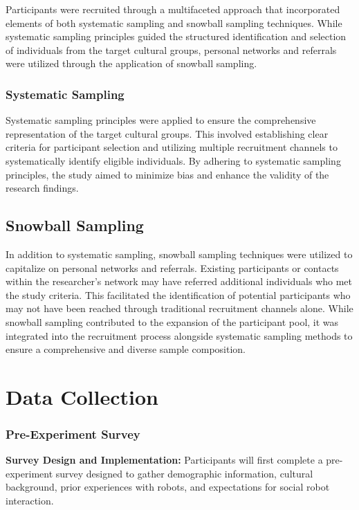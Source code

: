 Participants were recruited through a multifaceted approach that incorporated elements of both systematic sampling and snowball sampling techniques. While systematic sampling principles guided the structured identification and selection of individuals from the target cultural groups, personal networks and referrals were utilized through the application of snowball sampling.

\subsubsection{Systematic Sampling}

Systematic sampling principles were applied to ensure the comprehensive representation of the target cultural groups. This involved establishing clear criteria for participant selection and utilizing multiple recruitment channels to systematically identify eligible individuals. By adhering to systematic sampling principles, the study aimed to minimize bias and enhance the validity of the research findings.

\subsection{Snowball Sampling}

In addition to systematic sampling, snowball sampling techniques were utilized to capitalize on personal networks and referrals. Existing participants or contacts within the researcher's network may have referred additional individuals who met the study criteria. This facilitated the identification of potential participants who may not have been reached through traditional recruitment channels alone. While snowball sampling contributed to the expansion of the participant pool, it was integrated into the recruitment process alongside systematic sampling methods to ensure a comprehensive and diverse sample composition.

\section{Data Collection}

\subsubsection{Pre-Experiment Survey}

\textbf{Survey Design and Implementation:} Participants will first complete a pre-experiment survey designed to gather demographic information, cultural background, prior experiences with robots, and expectations for social robot interaction.

